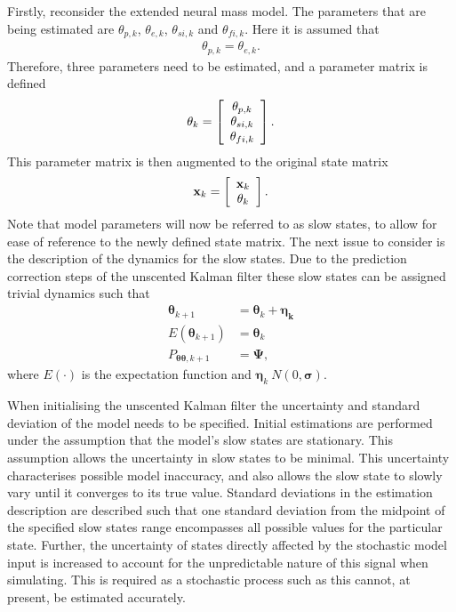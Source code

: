 Firstly, reconsider the extended neural mass model. The parameters that are being estimated are $\theta_{p,k}$, $\theta_{e,k}$, $\theta_{si,k}$ and $\theta_{fi,k}$. Here it is assumed that \begin{align}
\theta_{p,k} = \theta_{e,k}.
\end{align} Therefore, three parameters need to be estimated, and a parameter matrix is defined
\[ \mathbf{\theta}_{k} = \left[ \begin{array}[pos]{c}
\theta_{p,k}\\
\theta_{si,k} \\
\theta_{fi,k} \end{array} \right] .\] This parameter matrix is then augmented to the original state matrix
\[ \mathbf{x}_{k} = \left[ \begin{array}[pos]{c}
\mathbf{x}_{k}\\
\mathbf{\theta}_{k} \end{array} \right] .\] Note that model parameters will now be referred to as slow states, to allow for ease of reference to the newly defined state matrix. The next issue to consider is the description of the dynamics for the slow states. Due to the prediction correction steps of the unscented Kalman filter these slow states can be assigned trivial dynamics such that
\begin{align}
\label{eqn: parameterdynamics}
\mathbf{\theta}_{k+1} &= \mathbf{\theta}_{k} + \mathbf{\eta_{k}}\\
E(\mathbf{\theta}_{k+1}) &= \mathbf{\theta}_{k}\\
P_{\mathbf{\theta} \mathbf{\theta},k+1} &= \mathbf{\Psi},
\end{align} where $E(\cdot)$ is the expectation function and $\mathbf{\eta}_{k}~ N(0,\mathbf{\sigma})$.

When initialising the unscented Kalman filter the uncertainty and standard deviation of the model needs to be specified. Initial estimations are performed under the assumption that the model's slow states are stationary. This assumption allows the uncertainty in slow states to be minimal. This uncertainty characterises possible model inaccuracy, and also allows the slow state to slowly vary until it converges to its true value. Standard deviations in the estimation description are described such that one standard deviation from the midpoint of the specified slow states range encompasses all possible values for the particular state. Further, the uncertainty of states directly affected by the stochastic model input is increased to account for the unpredictable nature of this signal when simulating. This is required as a stochastic process such as this cannot, at present, be estimated accurately. 

